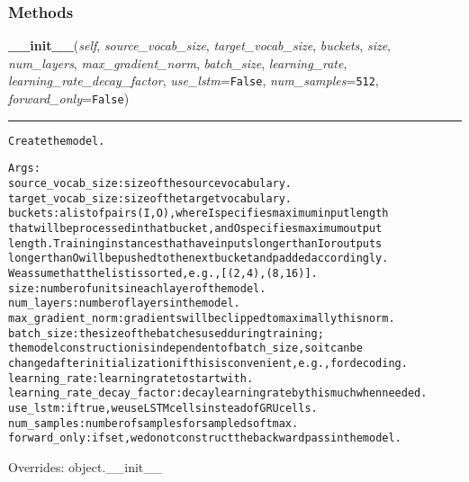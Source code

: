 
  \subsubsection{Methods}

    \vspace{0.5ex}

\hspace{.8\funcindent}\begin{boxedminipage}{\funcwidth}

    \raggedright \textbf{\_\_init\_\_}(\textit{self}, \textit{source\_vocab\_size}, \textit{target\_vocab\_size}, \textit{buckets}, \textit{size}, \textit{num\_layers}, \textit{max\_gradient\_norm}, \textit{batch\_size}, \textit{learning\_rate}, \textit{learning\_rate\_decay\_factor}, \textit{use\_lstm}={\tt False}, \textit{num\_samples}={\tt 512}, \textit{forward\_only}={\tt False})

    \vspace{-1.5ex}

    \rule{\textwidth}{0.5\fboxrule}
\setlength{\parskip}{2ex}
\begin{alltt}
Create the model.

Args:
  source\_vocab\_size: size of the source vocabulary.
  target\_vocab\_size: size of the target vocabulary.
  buckets: a list of pairs (I, O), where I specifies maximum input length
    that will be processed in that bucket, and O specifies maximum output
    length. Training instances that have inputs longer than I or outputs
    longer than O will be pushed to the next bucket and padded accordingly.
    We assume that the list is sorted, e.g., [(2, 4), (8, 16)].
  size: number of units in each layer of the model.
  num\_layers: number of layers in the model.
  max\_gradient\_norm: gradients will be clipped to maximally this norm.
  batch\_size: the size of the batches used during training;
    the model construction is independent of batch\_size, so it can be
    changed after initialization if this is convenient, e.g., for decoding.
  learning\_rate: learning rate to start with.
  learning\_rate\_decay\_factor: decay learning rate by this much when needed.
  use\_lstm: if true, we use LSTM cells instead of GRU cells.
  num\_samples: number of samples for sampled softmax.
  forward\_only: if set, we do not construct the backward pass in the model.
\end{alltt}

\setlength{\parskip}{1ex}
      Overrides: object.\_\_init\_\_

    \end{boxedminipage}

